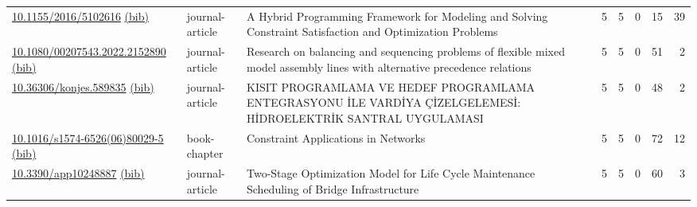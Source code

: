 {\begin{longtable}{p{5cm}lp{11cm}rrrrr}
\href{http://dx.doi.org/10.1155/2016/5102616}{10.1155/2016/5102616} \href{https://www.doi2bib.org/bib/10.1155/2016/5102616}{(bib)} & journal-article & A Hybrid Programming Framework for Modeling and Solving Constraint Satisfaction and Optimization Problems & 5 & 5 & 0 & 15 & 39 \\
\href{http://dx.doi.org/10.1080/00207543.2022.2152890}{10.1080/00207543.2022.2152890} \href{https://www.doi2bib.org/bib/10.1080/00207543.2022.2152890}{(bib)} & journal-article & Research on balancing and sequencing problems of flexible mixed model assembly lines with alternative precedence relations & 5 & 5 & 0 & 51 & 2 \\
\href{http://dx.doi.org/10.36306/konjes.589835}{10.36306/konjes.589835} \href{https://www.doi2bib.org/bib/10.36306/konjes.589835}{(bib)} & journal-article & KISIT PROGRAMLAMA VE HEDEF PROGRAMLAMA ENTEGRASYONU İLE VARDİYA ÇİZELGELEMESİ: HİDROELEKTRİK SANTRAL UYGULAMASI & 5 & 5 & 0 & 48 & 2 \\
\href{http://dx.doi.org/10.1016/s1574-6526(06)80029-5}{10.1016/s1574-6526(06)80029-5} \href{https://www.doi2bib.org/bib/10.1016/s1574-6526(06)80029-5}{(bib)} & book-chapter & Constraint Applications in Networks & 5 & 5 & 0 & 72 & 12 \\
\href{http://dx.doi.org/10.3390/app10248887}{10.3390/app10248887} \href{https://www.doi2bib.org/bib/10.3390/app10248887}{(bib)} & journal-article & Two-Stage Optimization Model for Life Cycle Maintenance Scheduling of Bridge Infrastructure & 5 & 5 & 0 & 60 & 3 \\
\end{longtable}
}

